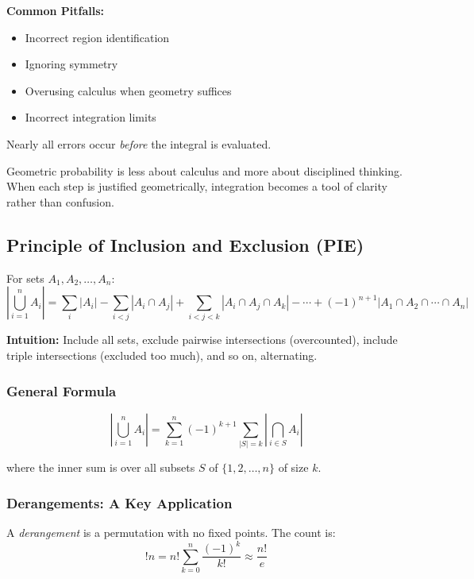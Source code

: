 \documentclass[12pt]{extarticle}
\begin{document}
\begin{remarkbox}
\textbf{Common Pitfalls:}
\begin{itemize}
    \item Incorrect region identification
    \item Ignoring symmetry
    \item Overusing calculus when geometry suffices
    \item Incorrect integration limits
\end{itemize}
Nearly all errors occur \textit{before} the integral is evaluated.
\end{remarkbox}

\begin{remarkbox}
Geometric probability is less about calculus and more about disciplined thinking. When each step is justified geometrically, integration becomes a tool of clarity rather than confusion.
\end{remarkbox}
\newpage
\subsection{Principle of Inclusion and Exclusion (PIE)}

For sets $A_1, A_2, \dots, A_n$:
\[
\left| \bigcup_{i=1}^{n} A_i \right| = \sum_{i} |A_i| - \sum_{i<j} |A_i \cap A_j| + \sum_{i<j<k} |A_i \cap A_j \cap A_k| - \cdots + (-1)^{n+1} |A_1 \cap A_2 \cap \cdots \cap A_n|
\]

\textbf{Intuition:} Include all sets, exclude pairwise intersections (overcounted), include triple intersections (excluded too much), and so on, alternating.

\subsubsection{General Formula}

\[
\left| \bigcup_{i=1}^{n} A_i \right| = \sum_{k=1}^{n} (-1)^{k+1} \sum_{|S|=k} \left| \bigcap_{i \in S} A_i \right|
\]

where the inner sum is over all subsets $S$ of $\{1, 2, \ldots, n\}$ of size $k$.
\pagebreak
\subsubsection{Derangements: A Key Application}

A \textit{derangement} is a permutation with no fixed points. The count is:
\[
!n = n! \sum_{k=0}^{n} \frac{(-1)^k}{k!} \approx \frac{n!}{e}
\]
\end{document}
